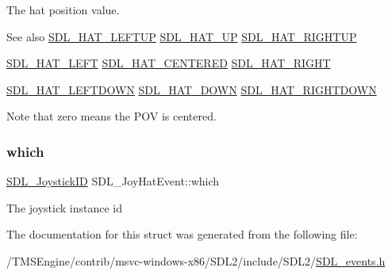 The hat position value. \begin{DoxySeeAlso}{See also}
\hyperlink{_s_d_l__joystick_8h_a6d7988b43c09ced08ec318a2556f1858}{S\+D\+L\+\_\+\+H\+A\+T\+\_\+\+L\+E\+F\+T\+UP} \hyperlink{_s_d_l__joystick_8h_ac916fe96c0740790e5496e12c67d8889}{S\+D\+L\+\_\+\+H\+A\+T\+\_\+\+UP} \hyperlink{_s_d_l__joystick_8h_a65fde978b4ab9c269c215d1922ae7755}{S\+D\+L\+\_\+\+H\+A\+T\+\_\+\+R\+I\+G\+H\+T\+UP} 

\hyperlink{_s_d_l__joystick_8h_a4666c12cae25d8bab053d8569396cd77}{S\+D\+L\+\_\+\+H\+A\+T\+\_\+\+L\+E\+FT} \hyperlink{_s_d_l__joystick_8h_adbfd6f0bad25cd1bb79f8c0a065f3833}{S\+D\+L\+\_\+\+H\+A\+T\+\_\+\+C\+E\+N\+T\+E\+R\+ED} \hyperlink{_s_d_l__joystick_8h_a5d1844afaf2ceaf58c689a8bd480a543}{S\+D\+L\+\_\+\+H\+A\+T\+\_\+\+R\+I\+G\+HT} 

\hyperlink{_s_d_l__joystick_8h_a3fa8609d382a0f74507890491033c784}{S\+D\+L\+\_\+\+H\+A\+T\+\_\+\+L\+E\+F\+T\+D\+O\+WN} \hyperlink{_s_d_l__joystick_8h_aa87f7a91d6bae8b420b133559d983338}{S\+D\+L\+\_\+\+H\+A\+T\+\_\+\+D\+O\+WN} \hyperlink{_s_d_l__joystick_8h_abf50339da11ca12699ee2199607d275f}{S\+D\+L\+\_\+\+H\+A\+T\+\_\+\+R\+I\+G\+H\+T\+D\+O\+WN}
\end{DoxySeeAlso}
Note that zero means the P\+OV is centered. \mbox{\label{struct_s_d_l___joy_hat_event_ac9d9bb179f9116d16b3da47cacd74b55}} 
\subsubsection{\texorpdfstring{which}{which}}
{\footnotesize\ttfamily \hyperlink{_s_d_l__joystick_8h_a3c3d32500cb08f76ee8077983912c0bd}{S\+D\+L\+\_\+\+Joystick\+ID} S\+D\+L\+\_\+\+Joy\+Hat\+Event\+::which}

The joystick instance id 

The documentation for this struct was generated from the following file\+:\begin{DoxyCompactItemize}
\item 
/\+T\+M\+S\+Engine/contrib/msvc-\/windows-\/x86/\+S\+D\+L2/include/\+S\+D\+L2/\hyperlink{_s_d_l__events_8h}{S\+D\+L\+\_\+events.\+h}\end{DoxyCompactItemize}
